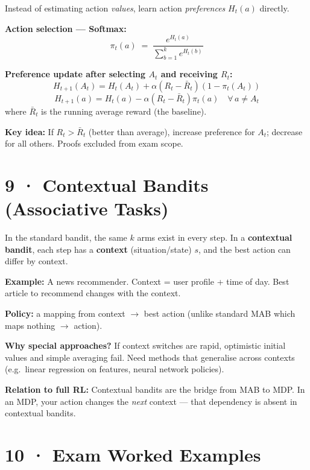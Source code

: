 \documentclass[11pt,a4paper]{article}
\begin{document}
Instead of estimating action \emph{values}, learn action \emph{preferences} $H_t(a)$ directly.

\textbf{Action selection — Softmax:}
\[
  \pi_t(a) \;=\; \frac{e^{H_t(a)}}{\sum_{b=1}^k e^{H_t(b)}}
\]

\textbf{Preference update after selecting $A_t$ and receiving $R_t$:}
\[
  H_{t+1}(A_t) = H_t(A_t) + \alpha(R_t - \bar{R}_t)(1 - \pi_t(A_t))
\]
\[
  H_{t+1}(a) = H_t(a) - \alpha(R_t - \bar{R}_t)\pi_t(a) \quad \forall\, a \neq A_t
\]
where $\bar{R}_t$ is the running average reward (the baseline).

\textbf{Key idea:} If $R_t > \bar{R}_t$ (better than average), increase preference for $A_t$;
decrease for all others. Proofs excluded from exam scope.

\section*{9 · Contextual Bandits (Associative Tasks)}

\begin{tcolorbox}[note={What are Contextual Bandits?}]
In the standard bandit, the same $k$ arms exist in every step.
In a \textbf{contextual bandit}, each step has a \textbf{context} (situation/state) $s$,
and the best action can differ by context.

\textbf{Example:} A news recommender. Context = user profile + time of day.
Best article to recommend changes with the context.

\textbf{Policy:} a mapping from context $\to$ best action (unlike standard MAB which maps nothing $\to$ action).

\textbf{Why special approaches?} If context switches are rapid, optimistic initial values and simple
averaging fail. Need methods that generalise across contexts (e.g.\ linear regression on features,
neural network policies).

\textbf{Relation to full RL:} Contextual bandits are the bridge from MAB to MDP.
In an MDP, your action changes the \emph{next} context — that dependency is absent in contextual bandits.
\end{tcolorbox}

\section*{10 · Exam Worked Examples}
\end{document}
